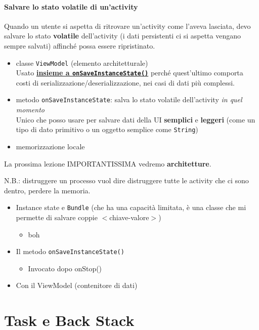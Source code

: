 \subsubsection{Salvare lo stato volatile di un'activity}
\par Quando un utente si aspetta di ritrovare un'activity come l'aveva lasciata, devo salvare lo stato \textbf{volatile} dell'activity (i dati persistenti ci si aspetta vengano sempre salvati) affinché possa essere ripristinato. 
\begin{itemize}
    \item classe \texttt{ViewModel} (elemento architetturale)\\
    Usato \textbf{\underline{insieme a \texttt{onSaveInstanceState()}}} perché quest'ultimo comporta costi di serializzazione/deserializzazione, nei casi di dati più complessi.
    \item metodo \texttt{onSaveInstanceState}: salva lo stato volatile dell'activity \textit{in quel momento}\\
    Unico che posso usare per salvare dati della UI \textbf{semplici} e \textbf{leggeri} (come un tipo di dato primitivo o un oggetto semplice come \texttt{String})
    \item memorizzazione locale
\end{itemize}
\par La prossima lezione IMPORTANTISSIMA vedremo \textbf{architetture}.
\par N.B.: distruggere un processo vuol dire distruggere tutte le activity che ci sono dentro, perdere la memoria.
\begin{itemize}
    \item Instance state e \texttt{Bundle} (che ha una capacità limitata, è una classe che mi permette di salvare coppie $<$chiave-valore$>$)
    \begin{itemize}
        \item boh
    \end{itemize}
    \item Il metodo \texttt{onSaveInstanceState()}
    \begin{itemize}
        \item Invocato dopo onStop()
    \end{itemize}
    \item Con il ViewModel (contenitore di dati)
\end{itemize}

\chapter{Task e Back Stack}
